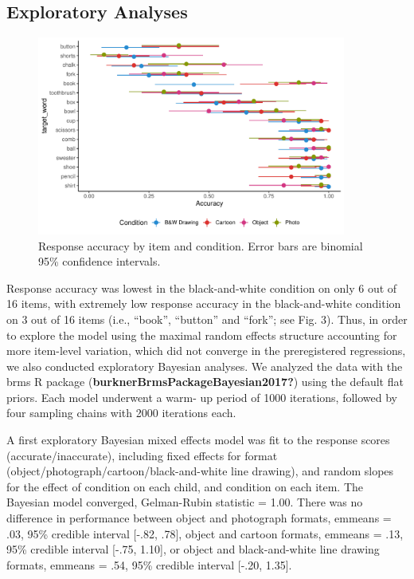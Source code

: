 \documentclass[10pt, letterpaper]{article}
\begin{document}
\subsection{Exploratory Analyses}\label{exploratory-analyses}

\begin{CodeChunk}
\begin{figure}[tb]

{\centering \includegraphics[width=4in]{figs/fig3-1} 

}

\caption[Response accuracy by item and condition]{Response accuracy by item and condition. Error bars are binomial 95\% confidence intervals.}\label{fig:fig3}
\end{figure}
\end{CodeChunk}

Response accuracy was lowest in the black-and-white condition on only 6
out of 16 items, with extremely low response accuracy in the
black-and-white condition on 3 out of 16 items (i.e., ``book'',
``button'' and ``fork''; see Fig. 3). Thus, in order to explore the
model using the maximal random effects structure accounting for more
item-level variation, which did not converge in the preregistered
regressions, we also conducted exploratory Bayesian analyses. We
analyzed the data with the brms R package
(\textbf{burknerBrmsPackageBayesian2017?}) using the default flat
priors. Each model underwent a warm- up period of 1000 iterations,
followed by four sampling chains with 2000 iterations each.

A first exploratory Bayesian mixed effects model was fit to the response
scores (accurate/inaccurate), including fixed effects for format
(object/photograph/cartoon/black-and-white line drawing), and random
slopes for the effect of condition on each child, and condition on each
item. The Bayesian model converged, Gelman-Rubin statistic = 1.00. There
was no difference in performance between object and photograph formats,
emmeans = .03, 95\% credible interval {[}-.82, .78{]}, object and
cartoon formats, emmeans = .13, 95\% credible interval {[}-.75, 1.10{]},
or object and black-and-white line drawing formats, emmeans = .54, 95\%
credible interval {[}-.20, 1.35{]}.
\end{document}
